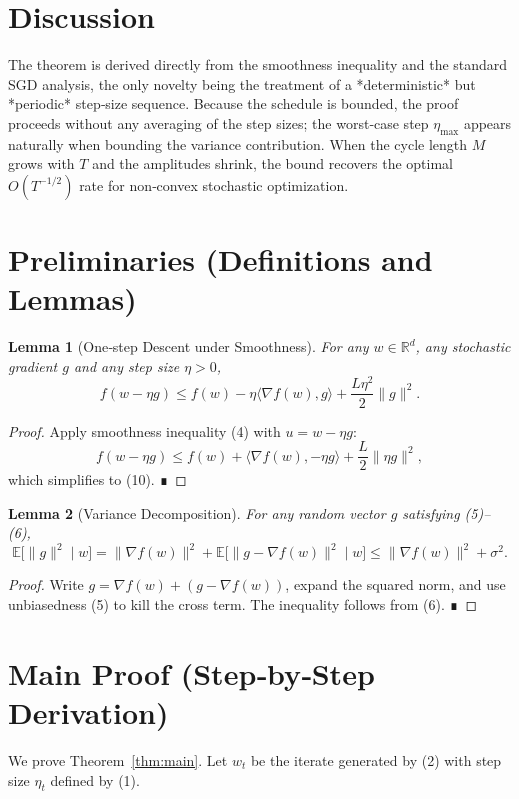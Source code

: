 \documentclass{article}
\newtheorem{lemma}{Lemma}
\begin{document}
\section*{Discussion}
The theorem is derived directly from the smoothness inequality and the standard SGD analysis, the only novelty being the treatment of a *deterministic* but *periodic* step‑size sequence. Because the schedule is bounded, the proof proceeds without any averaging of the step sizes; the worst‑case step $\eta_{\max}$ appears naturally when bounding the variance contribution. When the cycle length $M$ grows with $T$ and the amplitudes shrink, the bound recovers the optimal $O(T^{-1/2})$ rate for non‑convex stochastic optimization.

\newpage
\section*{Preliminaries (Definitions and Lemmas)}
\begin{lemma}[One‑step Descent under Smoothness]\label{lem:descent}
For any $w\in\mathbb{R}^{d}$, any stochastic gradient $g$ and any step size $\eta>0$,
\[
f(w-\eta g)\le f(w)-\eta\langle\nabla f(w),g\rangle+\frac{L\eta^{2}}{2}\|g\|^{2}.
\tag{10}
\]
\end{lemma}
\begin{proof}
Apply smoothness inequality (4) with $u=w-\eta g$:
\[
f(w-\eta g)\le f(w)+\langle\nabla f(w),-\eta g\rangle+\frac{L}{2}\|\eta g\|^{2},
\]
which simplifies to (10). ∎
\end{proof}

\begin{lemma}[Variance Decomposition]\label{lem:variance}
For any random vector $g$ satisfying (5)–(6),
\[
\mathbb{E}\big[\|g\|^{2}\mid w\big]=\|\nabla f(w)\|^{2}+\mathbb{E}\big[\|g-\nabla f(w)\|^{2}\mid w\big]
\le \|\nabla f(w)\|^{2}+\sigma^{2}.
\tag{11}
\]
\end{lemma}
\begin{proof}
Write $g=\nabla f(w)+(g-\nabla f(w))$, expand the squared norm, and use unbiasedness (5) to kill the cross term. The inequality follows from (6). ∎
\end{proof}

\section*{Main Proof (Step‑by‑Step Derivation)}
We prove Theorem~\ref{thm:main}. Let $w_t$ be the iterate generated by (2) with step size $\eta_t$ defined by (1).
\end{document}
